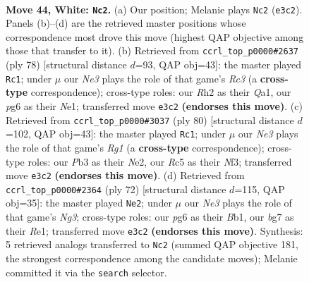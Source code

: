 \documentclass[11pt]{article}
\begin{document}
\clearpage

\begin{figure}[p]\centering
\begin{subfigure}{0.46\textwidth}\centering
\resizebox{\linewidth}{!}{%
\newchessgame
\chessboard[
  setfen={rn1qk1r1/4n1b1/2p3p1/2Rp2P1/3P1P1p/1P2N2P/1B1QB2R/6K1 w - - 17 44},
  showmover=false,
  pgfstyle=straightmove, color=movearrow, markmove={e3-c2}
]}
\caption{}
\end{subfigure}\hfill
\begin{subfigure}{0.46\textwidth}\centering
\resizebox{\linewidth}{!}{%
\newchessgame
\chessboard[
  setfen={3q1nk1/p2rn1p1/1p2pp1p/1b6/1P2P2P/P1R1BPPB/8/Q3N1K1 w - - 4 40},
  showmover=false,
  pgfstyle=straightmove, color=movearrow, markmove={c3-c1}
]}
\caption{}
\end{subfigure}
\\[4pt]
\begin{subfigure}{0.46\textwidth}\centering
\resizebox{\linewidth}{!}{%
\newchessgame
\chessboard[
  setfen={4q1kr/5pp1/p1b2n2/1p2pP1n/1P2P2P/P3QN1K/4N3/1B4R1 w - - 0 41},
  showmover=false,
  pgfstyle=straightmove, color=movearrow, markmove={g1-c1}
]}
\caption{}
\end{subfigure}\hfill
\begin{subfigure}{0.46\textwidth}\centering
\resizebox{\linewidth}{!}{%
\newchessgame
\chessboard[
  setfen={4qnk1/4n1p1/r3pp2/1p1b3p/2pP3P/2P3NQ/1P1B1PP1/1B2R1K1 w - - 17 37},
  showmover=false,
  pgfstyle=straightmove, color=movearrow, markmove={g3-e2}
]}
\caption{}
\end{subfigure}
\caption{\textbf{Move 44, White: \texttt{Nc2}.} (a) Our position; Melanie plays \texttt{Nc2} (\texttt{e3c2}). Panels (b)--(d) are the retrieved master positions whose correspondence most drove this move (highest QAP objective among those that transfer to it). (b) Retrieved from \texttt{ccrl\_top\_p0000\#2637} (ply 78) [structural distance $d$=93, QAP obj=43]: the master played \texttt{Rc1}; under $\mu$ our \emph{Ne3} plays the role of that game's \emph{Rc3} (a \textbf{cross-type} correspondence); cross-type roles: our \emph{R}h2 as their \emph{Q}a1, our \emph{p}g6 as their \emph{N}e1; transferred move \texttt{e3c2} \textbf{(endorses this move)}. (c) Retrieved from \texttt{ccrl\_top\_p0000\#3037} (ply 80) [structural distance $d$=102, QAP obj=43]: the master played \texttt{Rc1}; under $\mu$ our \emph{Ne3} plays the role of that game's \emph{Rg1} (a \textbf{cross-type} correspondence); cross-type roles: our \emph{P}b3 as their \emph{N}e2, our \emph{R}c5 as their \emph{N}f3; transferred move \texttt{e3c2} \textbf{(endorses this move)}. (d) Retrieved from \texttt{ccrl\_top\_p0000\#2364} (ply 72) [structural distance $d$=115, QAP obj=35]: the master played \texttt{Ne2}; under $\mu$ our \emph{Ne3} plays the role of that game's \emph{Ng3}; cross-type roles: our \emph{p}g6 as their \emph{B}b1, our \emph{b}g7 as their \emph{R}e1; transferred move \texttt{e3c2} \textbf{(endorses this move)}. Synthesis: 5 retrieved analogs transferred to \texttt{Nc2} (summed QAP objective 181, the strongest correspondence among the candidate moves); Melanie committed it via the \texttt{search} selector.}
\label{fig:thought-m86}
\end{figure}
\end{document}
